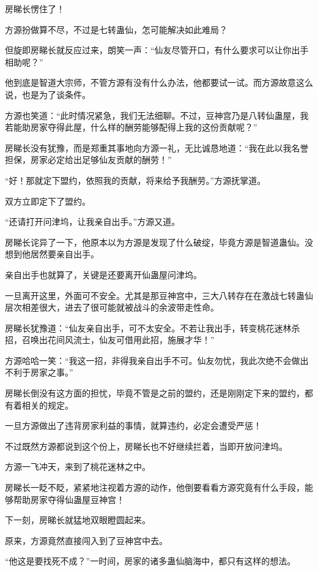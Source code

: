 
\begin{this_body}

房睇长愣住了！

方源扮做算不尽，不过是七转蛊仙，怎可能解决如此难局？

但旋即房睇长就反应过来，朗笑一声：“仙友尽管开口，有什么要求可以让你出手相助呢？”

他到底是智道大宗师，不管方源有没有什么办法，他都要试一试。而方源故意这么说，也是为了谈条件。

方源也笑道：“此时情况紧急，我们无法细聊。不过，豆神宫乃是八转仙蛊屋，我若能助房家夺得此屋，什么样的酬劳能够配得上我的这份贡献呢？”

房睇长没有犹豫，而是郑重其事地向方源一礼，无比诚恳地道：“我在此以我名誉担保，房家必定给出足够仙友贡献的酬劳！”

“好！那就定下盟约，依照我的贡献，将来给予我酬劳。”方源抚掌道。

双方立即定下了盟约。

“还请打开问津坞，让我亲自出手。”方源又道。

房睇长诧异了一下，他原本以为方源是发现了什么破绽，毕竟方源是智道蛊仙。没想到他居然要亲自出手。

亲自出手也就算了，关键是还要离开仙蛊屋问津坞。

一旦离开这里，外面可不安全。尤其是那豆神宫中，三大八转存在在激战七转蛊仙层次相差很大，进去了很可能就被战斗的余波带走性命。

房睇长犹豫道：“仙友亲自出手，可不太安全。不若让我出手，转变桃花迷林杀招，召唤出花间风流士，仙友可借用此招，施展才华！”

方源哈哈一笑：“我这一招，非得我亲自出手不可。仙友勿忧，我此次绝不会做出不利于房家之事。”

房睇长倒没有这方面的担忧，毕竟不管是之前的盟约，还是刚刚定下来的盟约，都有着相关的规定。

一旦方源做出了违背房家利益的事情，就算违约，必定会遭受严惩！

不过既然方源都说到这个份上，房睇长也不好继续拦着，当即开放问津坞。

方源一飞冲天，来到了桃花迷林之中。

房睇长一眨不眨，紧紧地注视着方源的动作，他倒要看看方源究竟有什么手段，能够帮助房家夺得仙蛊屋豆神宫！

下一刻，房睇长就猛地双眼瞪圆起来。

原来，方源竟然直接闯入到了豆神宫中去。

“他这是要找死不成？”一时间，房家的诸多蛊仙脑海中，都只有这样的想法。


\end{this_body}

